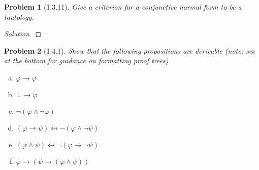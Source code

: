 \documentclass[letter]{article}
\newtheorem{problem}{Problem}
\theoremstyle{definition}
\newenvironment{solution}
{\begin{proof}[Solution]}
	{\end{proof}}
\begin{document}
\begin{problem}[1.3.11] Give a criterion for a conjunctive normal form to be a tautology.
\end{problem}
\begin{solution}
\end{solution}

\begin{problem}[1.4.1] Show that the following propositions are derivable (note: see at the bottom for guidance on formatting proof trees)
\begin{enumerate}[(a)]
    \item $\varphi \to \varphi$
    \item $\bot \to \varphi$
    \item $\neg (\varphi \land \neg \varphi)$
    \item $(\varphi \to \psi) \leftrightarrow \neg (\varphi \land \neg \psi)$
    \item $(\varphi \land \psi) \leftrightarrow \neg (\varphi \to \neg \psi)$
    \item $\varphi \to (\psi \to (\varphi \land \psi))$
\end{enumerate}
\end{problem}
\end{document}
